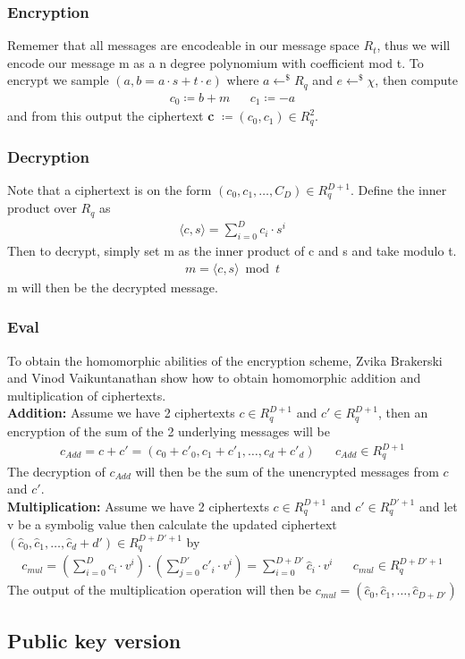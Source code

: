 \documentclass[../main.tex]{subfiles}
\begin{document}
    \subsubsection{Encryption}
    Rememer that all messages are encodeable in our message space $R_t$, thus we will encode our message m as a n degree
    polynomium with coefficient mod t.
    To encrypt we sample $(a, b = a \cdot s + t \cdot e)$ where $a \leftarrow^\$ R_q$ and $e \leftarrow^\$ \chi$,
    then compute
    \begin{align*}
        c_0 \coloneqq b + m && c_1 \coloneqq -a
    \end{align*}
    and from this output the ciphertext \textbf{c} $\coloneqq (c_0, c_1) \in R_q^2$.

    \subsubsection{Decryption}
    Note that a ciphertext is on the form $(c_0, c_1, \dots , C_{D}) \in R_q^{D+1}$.
    Define the inner product over $R_q$ as
    \begin{align*}
        \langle c, s \rangle = \sum_{i=0}^{D} c_i \cdot s^i
    \end{align*}
    Then to decrypt, simply set m as the inner product of c and s and take modulo t.
    \begin{align*}
        m = \langle c, s \rangle \bmod t
    \end{align*}
    m will then be the decrypted message.

    \subsubsection{Eval}
    To obtain the homomorphic abilities of the encryption scheme, Zvika Brakerski and Vinod Vaikuntanathan show
    how to obtain homomorphic addition and multiplication of ciphertexts.
    \\[2mm]
    \textbf{Addition:} Assume we have 2 ciphertexts $c \in R_q^{D+1}$ and $c' \in R_q^{D+1}$, then an encryption
    of the sum of the 2 underlying messages will be
    \begin{align*}
        c_{Add} = c + c' = (c_0 + c'_0, c_1 + c'_1, \dots , c_d + c'_d) && c_{Add} \in R_q^{D + 1}
    \end{align*}
    The decryption of $c_{Add}$ will then be the sum of the unencrypted messages from $c$ and $c'$.
    \\[2mm]
    \textbf{Multiplication:} Assume we have 2 ciphertexts $c \in R_q^{D+1}$ and $c' \in R_q^{D'+1}$ and let v be a symbolig value
    then calculate the updated ciphertext
    \\
    $(\hat{c}_0, \hat{c}_1, \dots, \hat{c}_d+d') \in R_q^{D + D' + 1}$ by
    \begin{align*}
        c_{mul} = (\sum_{i=0}^D c_i \cdot v^i) \cdot
                  (\sum_{j=0}^{D'} c'_i \cdot v^i) =
                   \sum_{i=0}^{D+D'} \hat{c}_i \cdot v^i
            && c_{mul} \in R_q^{D+D'+1}
    \end{align*}
    The output of the multiplication operation will then be $c_{mul} = (\hat{c}_0, \hat{c}_1, \dots, \hat{c}_{D+D'})$
    
    \subsection{Public key version}
\end{document}
